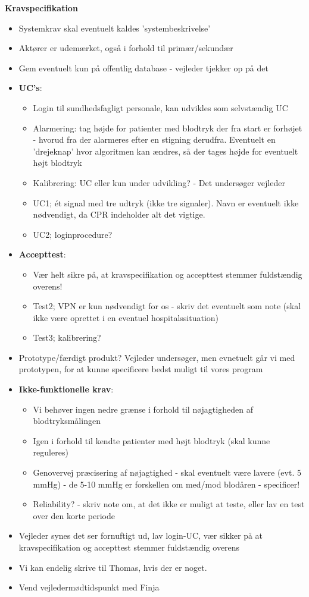 \documentclass[a4paper,11pt,oneside]{memoir}
\begin{document}
\textbf{Kravspecifikation}
\begin{itemize}
\item Systemkrav skal eventuelt kaldes 'systembeskrivelse'
\item Aktører er udemærket, også i forhold til primær/sekundær
\item Gem eventuelt kun på offentlig database - vejleder tjekker op på det 
\item \textbf{UC's}:
\begin{itemize}
\item Login til sundhedsfagligt personale, kan udvikles som selvstændig UC
\item Alarmering: tag højde for patienter med blodtryk der fra start er forhøjet - hvorud fra der alarmeres efter en stigning derudfra. Eventuelt en 'drejeknap' hvor algoritmen kan ændres, så der tages højde for eventuelt højt blodtryk
\item Kalibrering: UC eller kun under udvikling? - Det undersøger vejleder
\item UC1; ét signal med tre udtryk (ikke tre signaler). Navn er eventuelt ikke nødvendigt, da CPR indeholder alt det vigtige.
\item UC2; loginprocedure? 
\end{itemize}
\item \textbf{Accepttest}:
\begin{itemize}
\item Vær helt sikre på, at kravspecifikation og accepttest stemmer fuldstændig overens!
\item Test2; VPN er kun nødvendigt for os - skriv det eventuelt som note (skal ikke være oprettet i en eventuel hospitalssituation) 
\item Test3; kalibrering?
\end{itemize}
\item Prototype/færdigt produkt? Vejleder undersøger, men evnetuelt går vi med prototypen, for at kunne specificere bedst muligt til vores program 
\item \textbf{Ikke-funktionelle krav}:
\begin{itemize}
\item Vi behøver ingen nedre grænse i forhold til nøjagtigheden af blodtryksmålingen 
\item Igen i forhold til kendte patienter med højt blodtryk (skal kunne reguleres)
\item Genovervej præcisering af nøjagtighed - skal eventuelt være lavere (evt. 5 mmHg) - de 5-10 mmHg er forskellen om med/mod blodåren - specificer!
\item Reliability? - skriv note om, at det ikke er muligt at teste, eller lav en test over den korte periode
\end{itemize}
\item Vejleder synes det ser fornuftigt ud, lav login-UC, vær sikker på at kravspecifikation og accepttest stemmer fuldstændig overens 
\item Vi kan endelig skrive til Thomas, hvis der er noget.
\item Vend vejledermødtidspunkt med Finja
\end{itemize}
\end{document}
